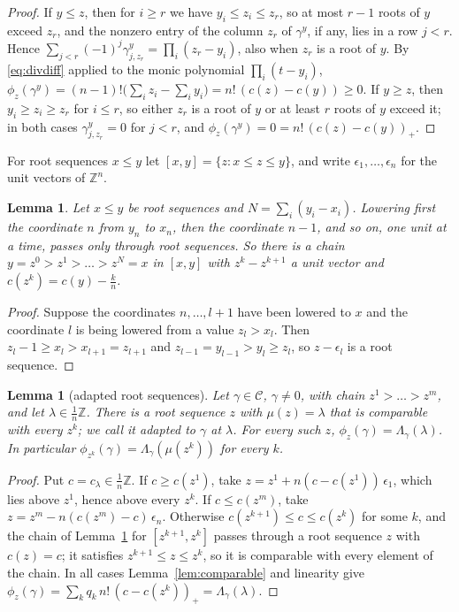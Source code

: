 \documentclass[11pt]{amsart}
\newtheorem{lemma}[theorem]{Lemma}
\theoremstyle{definition}
\theoremstyle{remark}
\newcommand{\ZZ}{\mathbb{Z}}
\newcommand{\CC}{\mathcal{C}}
\begin{document}
\begin{proof}
If $y\le z$, then for $i\ge r$ we have $y_i\le z_i\le z_r$, so at most $r-1$ roots of $y$ exceed $z_r$, and the nonzero entry of the column $z_r$ of $\gamma^y$, if any, lies in a row $j<r$. Hence $\sum_{j<r}(-1)^j\gamma^y_{j,z_r}=\prod_i(z_r-y_i)$, also when $z_r$ is a root of $y$. By \eqref{eq:divdiff} applied to the monic polynomial $\prod_i(t-y_i)$, $\phi_z(\gamma^y)=(n-1)!\big(\sum_iz_i-\sum_iy_i\big)=n!\,(c(z)-c(y))\ge0$. If $y\ge z$, then $y_i\ge z_i\ge z_r$ for $i\le r$, so either $z_r$ is a root of $y$ or at least $r$ roots of $y$ exceed it; in both cases $\gamma^y_{j,z_r}=0$ for $j<r$, and $\phi_z(\gamma^y)=0=n!\,(c(z)-c(y))_+$.
\end{proof}

For root sequences $x\le y$ let $[x,y]=\{z:x\le z\le y\}$, and write $\epsilon_1,\dots,\epsilon_n$ for the unit vectors of $\ZZ^n$.

\begin{lemma}\label{lem:chains}
Let $x\le y$ be root sequences and $N=\sum_i(y_i-x_i)$. Lowering first the coordinate $n$ from $y_n$ to $x_n$, then the coordinate $n-1$, and so on, one unit at a time, passes only through root sequences. So there is a chain $y=z^0>z^1>\dots>z^N=x$ in $[x,y]$ with $z^k-z^{k+1}$ a unit vector and $c(z^k)=c(y)-\frac kn$.
\end{lemma}

\begin{proof}
Suppose the coordinates $n,\dots,l+1$ have been lowered to $x$ and the coordinate $l$ is being lowered from a value $z_l>x_l$. Then $z_l-1\ge x_l>x_{l+1}=z_{l+1}$ and $z_{l-1}=y_{l-1}>y_l\ge z_l$, so $z-\epsilon_l$ is a root sequence.
\end{proof}

\begin{lemma}[adapted root sequences]\label{lem:adapted}
Let $\gamma\in\CC$, $\gamma\ne0$, with chain $z^1>\dots>z^m$, and let $\lambda\in\frac1n\ZZ$. There is a root sequence $z$ with $\mu(z)=\lambda$ that is comparable with every $z^k$; we call it \emph{adapted} to $\gamma$ at $\lambda$. For every such $z$, $\phi_z(\gamma)=\Lambda_\gamma(\lambda)$. In particular $\phi_{z^k}(\gamma)=\Lambda_\gamma(\mu(z^k))$ for every $k$.
\end{lemma}

\begin{proof}
Put $c=c_\lambda\in\frac1n\ZZ$. If $c\ge c(z^1)$, take $z=z^1+n(c-c(z^1))\,\epsilon_1$, which lies above $z^1$, hence above every $z^k$. If $c\le c(z^m)$, take $z=z^m-n(c(z^m)-c)\,\epsilon_n$. Otherwise $c(z^{k+1})\le c\le c(z^k)$ for some $k$, and the chain of Lemma~\ref{lem:chains} for $[z^{k+1},z^k]$ passes through a root sequence $z$ with $c(z)=c$; it satisfies $z^{k+1}\le z\le z^k$, so it is comparable with every element of the chain. In all cases Lemma~\ref{lem:comparable} and linearity give $\phi_z(\gamma)=\sum_kq_k\,n!\,(c-c(z^k))_+=\Lambda_\gamma(\lambda)$.
\end{proof}
\end{document}
